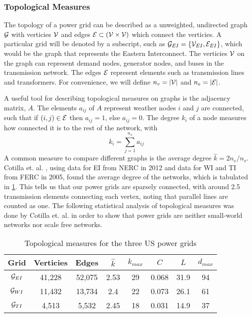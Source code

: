 \subsubsection{Topological Measures}

The topology of a power grid can be described as a unweighted, undirected graph $\mathcal{G}$ with verticies $\mathcal{V}$ and edges $\mathcal{E} \subset (\mathcal{V} \times \mathcal{V})$ which connect the verticies.  A particular grid will be denoted by a subscript, such as $\mathcal{G}_{EI} = \left\{ \mathcal{V}_{EI}, \mathcal{E}_{EI} \right\}$, which would be the graph that represents the Eastern Interconnect.  The verticies $\mathcal{V}$ on the graph can represent demand nodes, generator nodes, and buses in the transmission network.  The edges $\mathcal{E}$ represent elements such as transmission lines and transformers.  For convenience, we will define $n_v = \left| \mathcal{V} \right|$ and $n_e = \left| \mathcal{E} \right|$.

A useful tool for describing topological measures on graphs is the adjacency matrix, $A$.  The elements $a_{ij}$ of $A$ represent weather nodes $i$ and $j$ are connected, such that if $(i,j) \in \mathcal{E}$ then $a_{ij} = 1$, else $a_{ij}=0$.  The degree $k_i$ of a node measures how connected it is to the rest of the network, with
\begin{equation}
k_i = \sum_{j=1}^{n_v} a_{ij}
\end{equation}
A common measure to compare different graphs is the average degree $\hat{k} = 2 n_e/n_v$.  Cotilla et. al. \cite{cotilla_2012}, using data for EI from NERC in 2012 and data for WI and TI from FERC in 2005, found the average degree of the networks, which is tabulated in \ref{tab:topo_info}.  This tells us that our power grids are sparsely connected, with around 2.5 transmission elements connecting each vertex, noting that parallel lines are counted as one.  The following statistical analysis of topological measures was done by Cotilla et. al. \cite{cotilla_2012} in order to show that power grids are neither small-world networks nor scale free networks.

\begin{table}
\centering
\begin{tabular}{| c | c c c c c c c|}
\hline
Grid & Verticies & Edges & $\hat{k}$  &  $k_{max}$ & $C$ & $L$ & $d_{max}$ \\
\hline
$\mathcal{G}_{EI}$	& 41,228	&	52,075	&	2.53	&	29	&	0.068	&	31.9	&	94	\\
$\mathcal{G}_{WI}$	& 11,432	&	13,734	&	2.4	&	22	&	0.073	&	26.1	&	61	\\
$\mathcal{G}_{TI}$ 	& 4,513	&	5,532		&	2.45	&	18	&	0.031	&	14.9	&	37	\\
\hline
\end{tabular}
\caption{Topological measures for the three US power grids}
\label{tab:topo_info}
\end{table}


